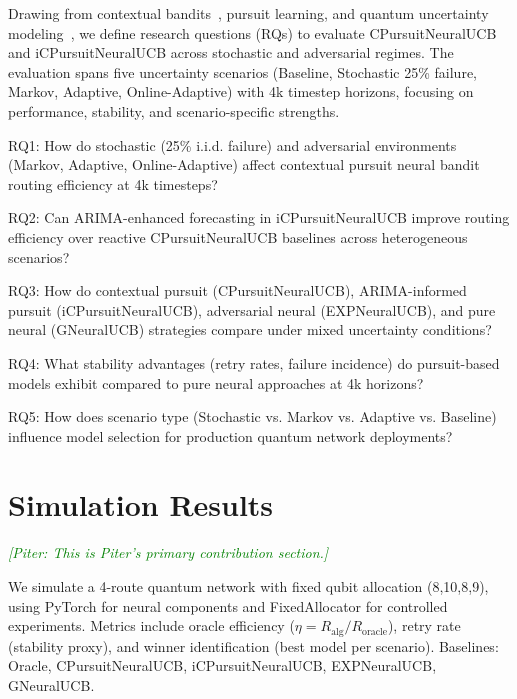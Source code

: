 \documentclass[sigconf,anonymous,review,natbib=false]{acmart}
\newcommand{\piter}[1]{\textcolor{green}{{\it [Piter: #1]}}}
\begin{document}
Drawing from contextual bandits~\cite{zhou2020neuralucb}, pursuit learning, and quantum uncertainty modeling~\cite{kozlowski2022utility}, we define research questions (RQs) to evaluate CPursuitNeuralUCB and iCPursuitNeuralUCB across stochastic and adversarial regimes. The evaluation spans five uncertainty scenarios (Baseline, Stochastic 25\% failure, Markov, Adaptive, Online-Adaptive) with 4k timestep horizons, focusing on performance, stability, and scenario-specific strengths.

\newcommand{\RQA}{RQ1: }
\newcommand{\RQB}{RQ2: }
\newcommand{\RQC}{RQ3: }
\newcommand{\RQD}{RQ4: }
\newcommand{\RQE}{RQ5: }

\RQA How do stochastic (25\% i.i.d. failure) and adversarial environments (Markov, Adaptive, Online-Adaptive) affect contextual pursuit neural bandit routing efficiency at 4k timesteps? 

\RQB Can ARIMA-enhanced forecasting in iCPursuitNeuralUCB improve routing efficiency over reactive CPursuitNeuralUCB baselines across heterogeneous scenarios? 

\RQC How do contextual pursuit (CPursuitNeuralUCB), ARIMA-informed pursuit (iCPursuitNeuralUCB), adversarial neural (EXPNeuralUCB), and pure neural (GNeuralUCB) strategies compare under mixed uncertainty conditions? 

\RQD What stability advantages (retry rates, failure incidence) do pursuit-based models exhibit compared to pure neural approaches at 4k horizons? 

\RQE How does scenario type (Stochastic vs. Markov vs. Adaptive vs. Baseline) influence model selection for production quantum network deployments? 





\section{Simulation Results} 
\label{sec: SimulationResults}
\piter{This is Piter's primary contribution section.}

We simulate a 4-route quantum network with fixed qubit allocation (8,10,8,9), using PyTorch for neural components and FixedAllocator for controlled experiments. Metrics include oracle efficiency ($\eta = R_{\text{alg}} / R_{\text{oracle}}$), retry rate (stability proxy), and winner identification (best model per scenario). Baselines: Oracle, CPursuitNeuralUCB, iCPursuitNeuralUCB, EXPNeuralUCB, GNeuralUCB.
\end{document}
